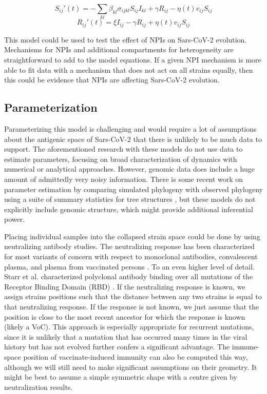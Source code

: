 \documentclass{article}
\begin{document}
\begin{equation}
    S_{ij}'(t) = -\sum_{kl} \beta_{kl} \sigma_{ijkl} S_{ij} I_{kl} + \gamma R_{ij} -  \eta(t) v_{ij} S_{ij} \label{Seqn}
\end{equation}
\begin{equation}
    R_{ij}'(t) = \xi I_{ij} - \gamma R_{ij} + \eta(t) v_{ij} S_{ij} \label{Reqn}
\end{equation}


This model could be used to test the effect of NPIs on Sars-CoV-2 evolution. Mechanisms for NPIs and additional compartments for heterogeneity are straightforward to add to the model equations. If a given NPI mechanism is more able to fit data with a mechanism that does not act on all strains equally, then this could be evidence that NPIs are affecting Sars-CoV-2 evolution. 


\subsection{Parameterization}

Parameterizing this model is challenging and would require a lot of assumptions about the antigenic space of Sars-CoV-2 that there is unlikely to be much data to support. The aforementioned research with these models do not use data to estimate parameters, focusing on broad characterization of dynamics with numerical or analytical approaches. However, genomic data does include a huge amount of admittedly very noisy information. There is some recent work on parameter estimation by comparing simulated phylogeny with observed phylogeny using a suite of summary statistics for tree structures \cite{danesh2021quantifying,leventhal2012inferring,saulnier2017inferring}, but these models do not explicitly include genomic structure, which might provide additional inferential power.

Placing individual samples into the collapsed strain space could be done by using neutralizing antibody studies. The neutralizing response has been characterized for most variants of concern with respect to monoclonal antibodies, convalescent plasma, and plasma from vaccinated persons \cite{stanford2020}. To an even higher level of detail. Starr et al. characterized polyclonal antibody binding over all mutations of the Receptor Binding Domain (RBD) \cite{starr2020deep}. If the neutralizing response is known, we assign strains positions such that the distance between any two strains is equal to that neutralizing response. If the response is not known, we just assume that the position is close to the most recent ancestor for which the response is known (likely a VoC). This approach is especially appropriate for recurrent mutations, since it is unlikely that a mutation that has occurred many times in the viral history but has not evolved further confers a significant advantage. The immune-space position of vaccinate-induced immunity can also be computed this way, although we will still need to make significant assumptions on their geometry. It might be best to assume a simple symmetric shape with a centre given by neutralization results. 
\end{document}
